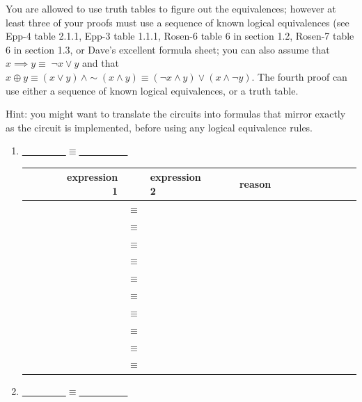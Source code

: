   You are  allowed to use truth  tables to figure  out the equivalences; however  at least
  three of your proofs must use a  sequence of known logical equivalences (see Epp-4 table
  2.1.1, Epp-3  table 1.1.1, Rosen-6 table  6 in section  1.2, Rosen-7 table 6  in section
  1.3, or Dave's excellent formula sheet; you can also assume that $x \implies y \equiv \;
  {\lnot x \vee y}$ and that $x \oplus y \equiv (x \lor y)\, \land \sim\! (x \land y) \equiv
  (\lnot x \land y) \lor (x \land \lnot y)$. The fourth proof can use either a sequence of
  known logical equivalences, or a truth table.

  Hint: you might want to translate the  circuits into formulas that mirror exactly as the
  circuit is implemented, before using any logical equivalence rules.
  \newpage
\begin{enumerate}
\item \LARGE\underline{~~~~~~~~~}$\equiv$\underline{~~~~~~~~~~}\\

\begin{tabular}{rcl|l}
~~~~~~expression 1 & & expression 2~~~~~~ & reason \\
\hline
& $\equiv$ & & ~~~~~~~~~~~~~~~~~~~~~~~\\
\hline
& $\equiv$ & & ~~~~~~~~~~~~~~~~~~~~~~~\\
\hline
& $\equiv$ & & ~~~~~~~~~~~~~~~~~~~~~~~\\
\hline
& $\equiv$ & & ~~~~~~~~~~~~~~~~~~~~~~~\\
\hline
& $\equiv$ & & ~~~~~~~~~~~~~~~~~~~~~~~\\
\hline
& $\equiv$ & & ~~~~~~~~~~~~~~~~~~~~~~~\\
\hline
& $\equiv$ & & ~~~~~~~~~~~~~~~~~~~~~~~\\
\hline
& $\equiv$ & & ~~~~~~~~~~~~~~~~~~~~~~~\\
\hline
& $\equiv$ & & ~~~~~~~~~~~~~~~~~~~~~~~\\
\hline
& $\equiv$ & & ~~~~~~~~~~~~~~~~~~~~~~~\\
\hline
\end{tabular}
\large
\newpage
\item \LARGE\underline{~~~~~~~~~}$\equiv$\underline{~~~~~~~~~~}\\


\end{enumerate}
